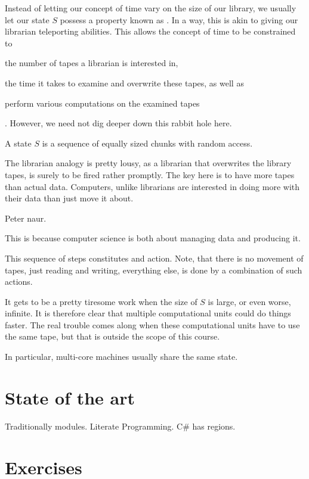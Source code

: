 Instead of letting our concept of time vary on the size of our library, we
usually let our state $S$ possess a property known as . In a
way, this is akin to giving our librarian teleporting abilities. This allows
the concept of time to be constrained to \begin{inparaenum}[(1)] \item the
number of tapes a librarian is interested in, \item the time it takes to
examine and overwrite these tapes, as well as \item perform various
computations on the examined tapes\end{inparaenum}. However, we need not dig
deeper down this rabbit hole here.

\begin{definition}

A state $S$ is a sequence of equally sized chunks with random access.

\end{definition}

The librarian analogy is pretty lousy, as a librarian that overwrites the
library tapes, is surely to be fired rather promptly. The key here is to have
more tapes than actual data. Computers, unlike librarians are interested in
doing more with their data than just move it about.

Peter naur.

This is because computer science is both about
managing data and producing it. 

This sequence of steps constitutes and action. Note, that there is no movement
of tapes, just reading and writing, everything else, is done by a combination
of such actions.


It gets to be a pretty tiresome work when the size of
$S$ is large, or even worse, infinite. It is therefore clear that multiple computational
units could do things faster. The real trouble comes along when these
computational units have to use the same tape, but that is outside the scope of
this course.

In particular, multi-core machines usually share the same state.



\section{State of the art}

Traditionally modules. Literate Programming. C\# has regions.

\section{Exercises}
